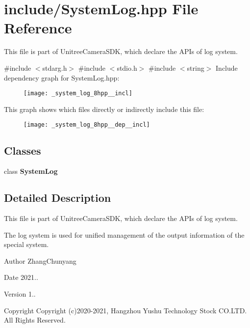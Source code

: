 \section{include/\+System\+Log.hpp File Reference}
\label{_system_log_8hpp}


This file is part of Unitree\+Camera\+S\+DK, which declare the A\+P\+Is of log system.  


{\ttfamily \#include $<$stdarg.\+h$>$}\newline
{\ttfamily \#include $<$stdio.\+h$>$}\newline
{\ttfamily \#include $<$string$>$}\newline
Include dependency graph for System\+Log.\+hpp\+:\nopagebreak
\begin{figure}[H]
\begin{center}
\leavevmode
\texttt{[image: \_system\_log\_8hpp\_\_incl]}
\end{center}
\end{figure}
This graph shows which files directly or indirectly include this file\+:\nopagebreak
\begin{figure}[H]
\begin{center}
\leavevmode
\texttt{[image: \_system\_log\_8hpp\_\_dep\_\_incl]}
\end{center}
\end{figure}
\subsection*{Classes}
\begin{DoxyCompactItemize}
\item 
class \textbf{ System\+Log}
\end{DoxyCompactItemize}


\subsection{Detailed Description}
This file is part of Unitree\+Camera\+S\+DK, which declare the A\+P\+Is of log system. 

The log system is used for unified management of the output information of the special system. \begin{DoxyAuthor}{Author}
Zhang\+Chunyang 
\end{DoxyAuthor}
\begin{DoxyDate}{Date}
2021.. 
\end{DoxyDate}
\begin{DoxyVersion}{Version}
1.. 
\end{DoxyVersion}
\begin{DoxyCopyright}{Copyright}
Copyright (c)2020-\/2021, Hangzhou Yushu Technology Stock C\+O.\+L\+TD. All Rights Reserved. 
\end{DoxyCopyright}
